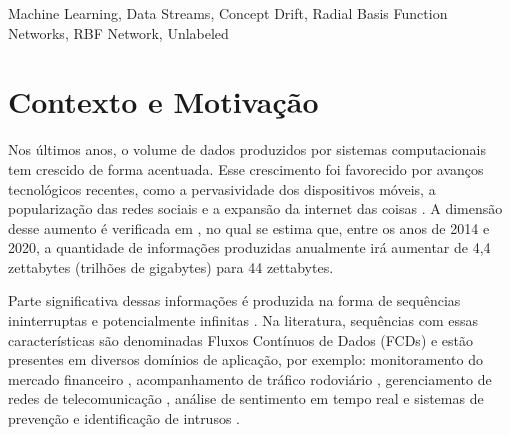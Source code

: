 \documentclass[qual, classic, a4paper]{ufbathesis}
\begin{document}
\abstract

\blindtext

\begin{keywords}
    Machine Learning, Data Streams, Concept Drift, Radial Basis Function Networks, RBF Network, Unlabeled
\end{keywords}


\tableofcontents

\listoffigures

\listoftables

\mainmatter

% 
% 
% 
%

 \label{introducao}

\section{Contexto e Motivação}

Nos últimos anos, o volume de dados produzidos por sistemas computacionais tem crescido de forma acentuada.
%
Esse crescimento foi favorecido por avanços tecnológicos recentes, como  
a pervasividade dos dispositivos móveis,
a popularização das redes sociais e 
a expansão da internet das coisas \cite{Cohen:BigData:2009:MSN:1687553.1687576}.
%
A dimensão desse aumento é verificada em \cite{idc_report}, 
no qual se estima que, entre os anos de 2014 e 2020,
a quantidade de informações produzidas anualmente irá aumentar de 4,4 zettabytes (trilhões de gigabytes) para 44 zettabytes.

Parte significativa dessas informações é produzida na forma de sequências ininterruptas e potencialmente infinitas \cite{Aggarwal:2006:DSM:1196418}.
%
Na literatura, sequências com essas características são denominadas Fluxos Contínuos de Dados (FCDs) e estão presentes em diversos domínios de aplicação, por exemplo:
monitoramento do mercado financeiro \cite{ZHOU:2015},
acompanhamento de tráfico rodoviário \cite{Wang:2015:EOV:2843092.2843464}, 
gerenciamento de redes de telecomunicação \cite{delattre2015method}, 
análise de sentimento em tempo real \cite{KRANJC2015187} e 
sistemas de prevenção e identificação de intrusos \cite{KENKRE:PAI:COLACO:2015}.
\end{document}

